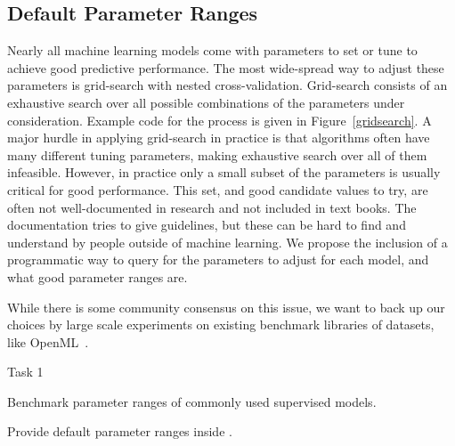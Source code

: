\subsection{Default Parameter Ranges}
Nearly all machine learning models come with parameters to set or tune
to achieve good predictive performance. The most wide-spread way to adjust
these parameters is grid-search with nested cross-validation.
Grid-search consists of an exhaustive search over all possible combinations
of the parameters under consideration. Example code for the process is given
in Figure~\ref{gridsearch}.
A major hurdle in applying grid-search in practice is that algorithms
often have many different tuning parameters, making exhaustive search
over all of them infeasible. However, in practice only a small subset
of the parameters is usually critical for good performance. This set,
and good candidate values to try, are often not well-documented in research and
not included in text books.
The \sklearn{} documentation tries to give guidelines, but these can be hard
to find and understand by people outside of machine learning.
We propose the inclusion of a programmatic way to query for the parameters
to adjust for each model, and what good parameter ranges are.

While there is some community consensus on this issue, we want to back
up our choices by large scale experiments on existing benchmark libraries
of datasets, like OpenML~\autocite{van2013openml}.
\begin{labeling}{Task 1}
    \item [Task 1] Benchmark parameter ranges of commonly used supervised models.
    \item [Task 2] Provide default parameter ranges inside \sklearn{}.
\end{labeling}


